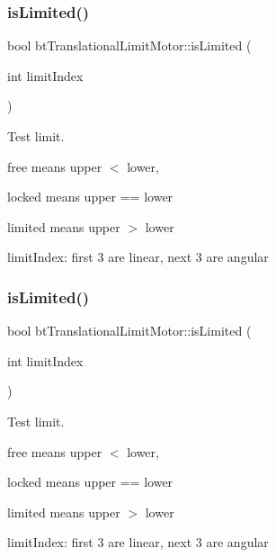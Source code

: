 \subsubsection{\texorpdfstring{is\+Limited()}{isLimited()}\hspace{0.1cm}{\footnotesize\ttfamily [1/2]}}
{\footnotesize\ttfamily bool bt\+Translational\+Limit\+Motor\+::is\+Limited (\begin{DoxyParamCaption}\item[{int}]{limit\+Index }\end{DoxyParamCaption})\hspace{0.3cm}{\ttfamily [inline]}}



Test limit. 


\begin{DoxyItemize}
\item free means upper $<$ lower,
\item locked means upper == lower
\item limited means upper $>$ lower
\item limit\+Index\+: first 3 are linear, next 3 are angular 
\end{DoxyItemize}\mbox{\label{classbtTranslationalLimitMotor_ae5bb30b955dcd0923d72642e37f00622}} 
\subsubsection{\texorpdfstring{is\+Limited()}{isLimited()}\hspace{0.1cm}{\footnotesize\ttfamily [2/2]}}
{\footnotesize\ttfamily bool bt\+Translational\+Limit\+Motor\+::is\+Limited (\begin{DoxyParamCaption}\item[{int}]{limit\+Index }\end{DoxyParamCaption})\hspace{0.3cm}{\ttfamily [inline]}}



Test limit. 


\begin{DoxyItemize}
\item free means upper $<$ lower,
\item locked means upper == lower
\item limited means upper $>$ lower
\item limit\+Index\+: first 3 are linear, next 3 are angular 
\end{DoxyItemize}\mbox{\label{classbtTranslationalLimitMotor_a40857b3a98cd8d8fc986516985726e49}} 
